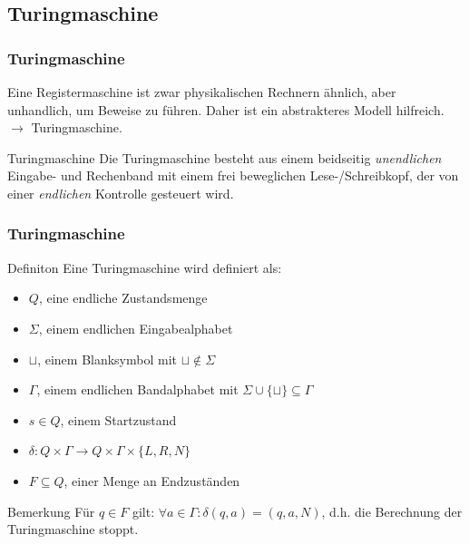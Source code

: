 \subsection{Turingmaschine}
\begin{frame}
\frametitle{Turingmaschine}
Eine Registermaschine ist zwar physikalischen Rechnern ähnlich, aber unhandlich, um Beweise zu führen.
Daher ist ein abstrakteres Modell hilfreich. \\
$\rightarrow$ Turingmaschine.
\pause
\begin{block}{Turingmaschine}
Die Turingmaschine besteht aus einem beidseitig \emph{unendlichen} Eingabe- und Rechenband
mit einem frei beweglichen Lese-/Schreibkopf, der von einer \emph{endlichen} Kontrolle gesteuert wird. 
\end{block}
\end{frame}
\begin{frame}
\frametitle{Turingmaschine}
\begin{block}{Definiton}
Eine Turingmaschine wird definiert als:
 \begin{itemize}
 \item $Q$, eine endliche Zustandsmenge
 \item $\Sigma$, einem endlichen Eingabealphabet
 \item $\sqcup$, einem Blanksymbol mit $\sqcup \notin \Sigma$
 \item $\Gamma$, einem endlichen Bandalphabet mit $\Sigma \cup\{\sqcup\} \subseteq \Gamma$
 \item $s \in Q$, einem Startzustand
 \item $\delta: Q\times\Gamma \rightarrow Q\times\Gamma\times\{L, R, N\}$
 \item $F \subseteq Q$, einer Menge an Endzuständen
 \end{itemize}
\end{block}
\begin{block}{Bemerkung}
 Für $q\in F$ gilt: $\forall a \in \Gamma: \delta(q, a) = (q, a, N)$, d.h. die Berechnung der Turingmaschine stoppt.
\end{block}
\end{frame}

